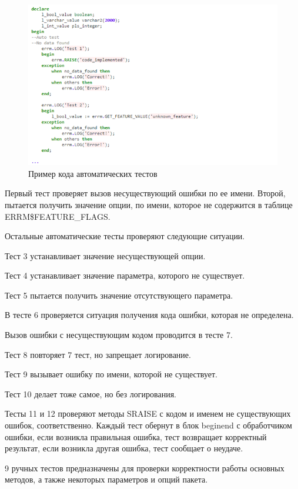 \begin{figure}[ht!] 
	\center
	\includegraphics [scale=1] {my_folder/img/c4_auto_test.png}
	\caption{Пример кода автоматических тестов} 
	\label{fig:c4_auto_test}  
\end{figure}
\FloatBarrier

Первый тест проверяет вызов несуществующий ошибки по ее имени. Второй, пытается получить значение опции, по имени, которое не содержится в таблице ERRM\$FEATURE\_FLAGS. 

Остальные автоматические тесты проверяют следующие ситуации.

Тест 3 устанавливает значение несуществующей опции.

Тест 4 устанавливает значение параметра, которого не существует.

Тест 5 пытается получить значение отсутствующего параметра.

В тесте 6 проверяется ситуация получения кода ошибки, которая не определена.

Вызов ошибки с несуществующим кодом проводится в тесте 7.

Тест 8 повторяет 7 тест, но запрещает логирование.

Тест 9 вызывает ошибку по имени, которой не существует.

Тест 10 делает тоже самое, но без логирования.

Тесты 11 и 12 проверяют методы SRAISE с кодом и именем не существующих ошибок, соответственно. 
Каждый тест обернут в блок begin\/end с обработчиком ошибки, если возникла правильная ошибка, тест возвращает корректный результат, если возникла другая ошибка, тест сообщает о неудаче. 

9 ручных тестов предназначены для проверки корректности работы основных методов, а также некоторых параметров и опций пакета.

